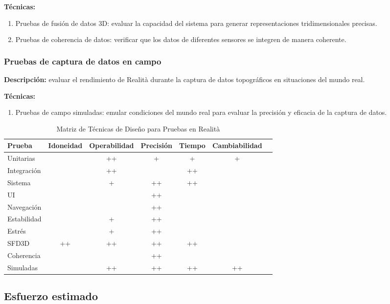 \documentclass[12pt,a4paper, twoside]{article} %
\begin{document}
\textbf{Técnicas:}
\begin{enumerate}
    \item Pruebas de fusión de datos 3D: evaluar la capacidad del sistema para generar representaciones tridimensionales precisas.
    \item Pruebas de coherencia de datos: verificar que los datos de diferentes sensores se integren de manera coherente.
\end{enumerate}

\subsubsection{Pruebas de captura de datos en campo}

\textbf{Descripción:} evaluar el rendimiento de Realità durante la captura de datos topográficos en situaciones del mundo real.

\textbf{Técnicas:}
\begin{enumerate}
    \item Pruebas de campo simuladas: emular condiciones del mundo real para evaluar la precisión y eficacia de la captura de datos.
\end{enumerate}


\begin{table}[h]
\centering
\begin{tabular}{|l|c|c|c|c|c|c|}
\hline
\textbf{Prueba} &\textbf{Idoneidad} & \textbf{Operabilidad} & \textbf{Precisión} & \textbf{Tiempo} & \textbf{Cambiabilidad}\\
\hline
Unitarias & & ++ & + & + & + \\
Integración & & ++ & & ++ &   \\
Sistema & & + & ++ & ++ & \\
UI & & & ++ & &\\
Navegación & & & ++ &  & \\
Estabilidad & & + & ++ &  &\\
Estrés & & + & ++ & & \\
SFD3D & ++ & ++ & ++ & ++ & \\
Coherencia  & & & ++ & &\\
Simuladas & & ++ & ++ & ++ & ++\\
\hline
\end{tabular}
\caption{Matriz de Técnicas de Diseño para Pruebas en Realità}
\label{tab:design_techniques_matrix}
\end{table}


\subsection{Esfuerzo estimado}
\end{document}
